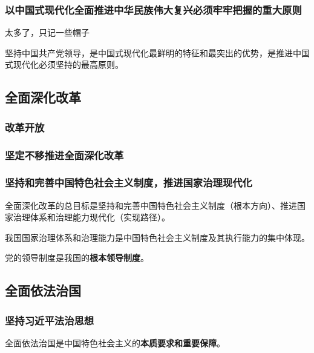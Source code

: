 \documentclass[12pt, a4paper, oneside]{ctexart}
\begin{document}
\subsubsection{以中国式现代化全面推进中华民族伟大复兴必须牢牢把握的重大原则}

太多了，只记一些帽子

坚持中国共产党领导，是中国式现代化最鲜明的特征和最突出的优势，是推进中国式现代化必须坚持的最高原则。

\subsection{全面深化改革}

\subsubsection{改革开放}

\subsubsection{坚定不移推进全面深化改革}

\subsubsection{坚持和完善中国特色社会主义制度，推进国家治理现代化}

全面深化改革的总目标是坚持和完善中国特色社会主义制度（根本方向）、推进国家治理体系和治理能力现代化（实现路径）。

我国国家治理体系和治理能力是中国特色社会主义制度及其执行能力的集中体现。

党的领导制度是我国的\textbf{根本领导制度}。

\subsection{全面依法治国}

\subsubsection{坚持习近平法治思想}

全面依法治国是中国特色社会主义的\textbf{本质要求和重要保障}。
\end{document}
